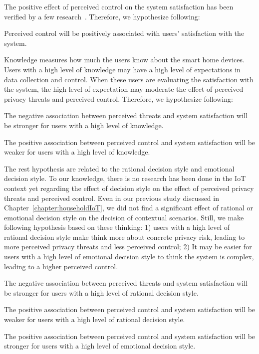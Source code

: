 The positive effect of perceived control on the system satisfaction has been verified by a few research~\cite{malhotra2004internet, madejski2012study}. Therefore, we hypothesize following:
\begin{theorem}
	Perceived control will be positively associated with users' satisfaction with the system.
\end{theorem}

Knowledge measures how much the users know about the smart home devices. Users with a high level of knowledge may have a high level of expectations in data collection and control. When these users are evaluating the satisfaction with the system, the high level of expectation may moderate the effect of perceived privacy threats and perceived control. Therefore, we hypothesize following:
\theoremgroup
\begin{theorem}
	The negative association between perceived threats and system satisfaction will be stronger for users with a high level of knowledge.
\end{theorem}
\begin{theorem}
	The positive association between perceived control and system satisfaction will be weaker for users with a high level of knowledge.
\end{theorem}

The rest hypothesis are related to the rational decision style and emotional decision style. To our knowledge, there is no research has been done in the IoT context yet regarding the effect of decision style on the effect of perceived privacy threats and perceived control. Even in our previous study discussed in Chapter~\ref{chapter:householdIoT}, we did not find a significant effect of rational or emotional decision style on the decision of contextual scenarios. Still, we make following hypothesis based on these thinking: 1) users with a high level of rational decision style make think more about concrete privacy risk, leading to more perceived privacy threats and less perceived control; 2) It may be easier for users with a high level of emotional decision style to think the system is complex, leading to a higher perceived control.
\theoremgroup
\begin{theorem}
	The negative association between perceived threats and system satisfaction will be stronger for users with a high level of rational decision style.
\end{theorem}
\begin{theorem}
	The positive association between perceived control and system satisfaction will be weaker for users with a high level of rational decision style.
\end{theorem}
\begin{theorem}
	The positive association between perceived control and system satisfaction will be stronger for users with a high level of emotional decision style.
\end{theorem}


